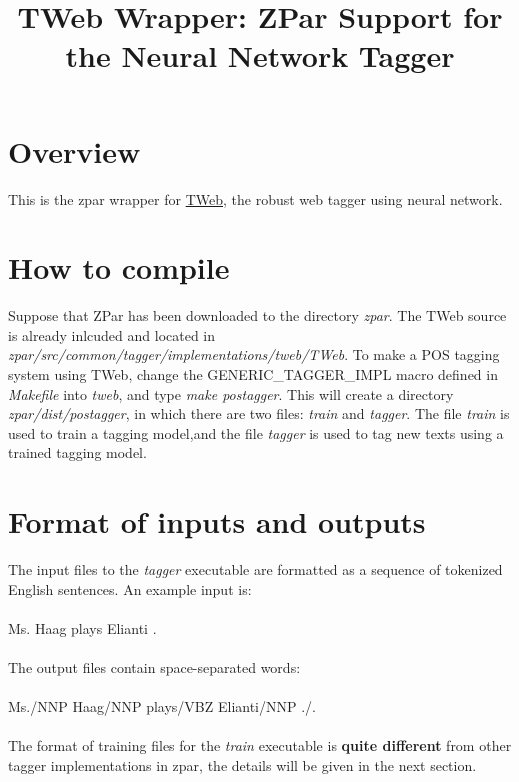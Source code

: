 \documentclass[12pt]{article}
\title{TWeb Wrapper: ZPar Support for the Neural Network Tagger}
\begin{document}
\begin{CJK}{GBK}{song}
\maketitle

\section{Overview}
\label{sec:overview}
This is the zpar wrapper for \href{https://github.com/majineu/TWeb}{TWeb}, the robust web tagger using neural network.

\section{How to compile}
Suppose that ZPar has been downloaded to the directory \textit{zpar}. 
The TWeb source is already inlcuded and located in \textit{zpar/src/common/tagger/implementations/tweb/TWeb}.
To make a POS tagging system using TWeb, 
change the GENERIC\_TAGGER\_IMPL macro defined in \textit{Makefile} into \textit{tweb},
and type \textit{make postagger}. 
This will create a directory \textit{zpar/dist/postagger}, in which there are two files: \textit{train} and \textit{tagger}. 
The file \textit{train} is used to train a tagging model,and the file \textit{tagger} is used to tag new texts using a trained tagging model.

\section{Format of inputs and outputs}
The input files to the \textit{tagger} executable are formatted as a sequence of tokenized English sentences. An example input is:
\\
\\
\hspace{3cm} Ms. Haag plays Elianti .
\\
\\
The output files contain space-separated words:
\\
\\
\hspace{3cm} Ms./NNP Haag/NNP plays/VBZ Elianti/NNP ./.
\\
\\
The format of training files for the \textit{train} executable is \textbf{quite different} from other tagger implementations in zpar,
the details will be given in the next section.


\end{CJK}
\end{document}
